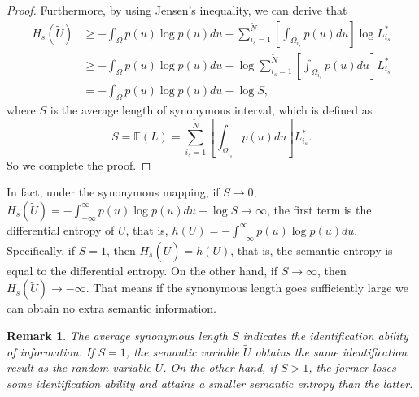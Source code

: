 \documentclass[12pt, draftclsnofoot,onecolumn]{IEEEtran}
\newtheorem{remark}{\bf{Remark}}
\begin{document}
\begin{proof}

Furthermore, by using Jensen's inequality, we can derive that
\begin{equation}
\begin{aligned}
H_s(\tilde{U})&\geq -\int_{\Omega} p(u)\log p(u) du -\sum_{i_s=1}^{\tilde{N}}\left[ \int_{\Omega_{i_s}} p(u) du \right] \log L^{*}_{i_s}\\
&\geq -\int_{\Omega} p(u)\log p(u) du -\log \sum_{i_s=1}^{\tilde{N}}\left[ \int_{\Omega_{i_s}} p(u) du \right] L^{*}_{i_s}\\
&= -\int_{\Omega} p(u)\log p(u) du -\log S,
\end{aligned}
\end{equation}
where $S$ is the average length of synonymous interval, which is defined as
\begin{equation}
S=\mathbb{E}( L)=\sum_{i_s=1}^{\tilde{N}}\left[ \int_{\Omega_{i_s}} p(u) du \right] L^{*}_{i_s}.
\end{equation}
So we complete the proof.
\end{proof}

In fact, under the synonymous mapping, if $S\to 0$, $H_s(\tilde{U})=-\int_{-\infty}^{\infty} p(u)\log p(u) du -\log S\to \infty$, the first term is the differential entropy of $U$, that is, $h(U)=-\int_{-\infty}^{\infty} p(u)\log p(u) du$. Specifically, if $S=1$, then $H_s(\tilde{U})=h(U)$, that is, the semantic entropy is equal to the differential entropy. On the other hand, if $S\to \infty$, then $H_s(\tilde{U})\to -\infty$. That means if the synonymous length goes sufficiently large we can obtain no extra semantic information.

\begin{remark}
The average synonymous length $S$ indicates the identification ability of information. If $S=1$, the semantic variable $\tilde{U}$ obtains the same identification result as the random variable $U$. On the other hand, if $S>1$, the former loses some identification ability and attains a smaller semantic entropy than the latter.
\end{remark}
\end{document}
